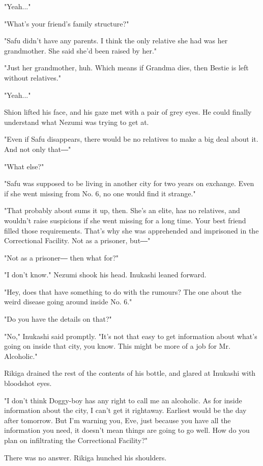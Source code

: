 "Yeah..."

"What's your friend's family structure?"

"Safu didn't have any parents. I think the only relative she had was her
grandmother. She said she'd been raised by her."

"Just her grandmother, huh. Which means if Grandma dies, then Bestie is
left without relatives."

"Yeah..."

Shion lifted his face, and his gaze met with a pair of grey eyes. He
could finally understand what Nezumi was trying to get at.

"Even if Safu disappears, there would be no relatives to make a big deal
about it. And not only that―"

"What else?"

"Safu was supposed to be living in another city for two years on
exchange. Even if she went missing from No. 6, no one would find it
strange."

"That probably about sums it up, then. She's an elite, has no relatives,
and wouldn't raise suspicions if she went missing for a long time. Your
best friend filled those requirements. That's why she was apprehended
and imprisoned in the Correctional Facility. Not as a prisoner, but―"

"Not as a prisoner― then what for?"

"I don't know." Nezumi shook his head. Inukashi leaned forward.

"Hey, does that have something to do with the rumours? The one about the
weird disease going around inside No. 6."

"Do you have the details on that?"

"No," Inukashi said promptly. "It's not that easy to get information
about what's going on inside that city, you know. This might be more of
a job for Mr. Alcoholic."

Rikiga drained the rest of the contents of his bottle, and glared at
Inukashi with bloodshot eyes.

"I don't think Doggy-boy has any right to call me an alcoholic. As for
inside information about the city, I can't get it rightaway. Earliest
would be the day after tomorrow. But I'm warning you, Eve, just because
you have all the information you need, it doesn't mean things are going
to go well. How do you plan on infiltrating the Correctional Facility?"

There was no answer. Rikiga hunched his shoulders.

